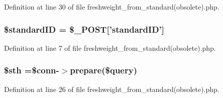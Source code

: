 Definition at line 30 of file freshweight\-\_\-from\-\_\-standard(obsolete).\-php.

\hypertarget{freshweight__from__standard_07obsolete_08_8php_a0c541a369e4a0434108a7d145751bb23}{
\subsubsection[{\$standard\-I\-D}]{\setlength{\rightskip}{0pt plus 5cm}\$standard\-I\-D = \$\-\_\-\-P\-O\-S\-T\mbox{[}'standard\-I\-D'\mbox{]}}}\label{freshweight__from__standard_07obsolete_08_8php_a0c541a369e4a0434108a7d145751bb23}


Definition at line 7 of file freshweight\-\_\-from\-\_\-standard(obsolete).\-php.

\hypertarget{freshweight__from__standard_07obsolete_08_8php_afa9126f9664959c02795be300a135f93}{
\subsubsection[{\$sth}]{\setlength{\rightskip}{0pt plus 5cm}\$sth =\$conn-\/$>$prepare(\$query)}}\label{freshweight__from__standard_07obsolete_08_8php_afa9126f9664959c02795be300a135f93}


Definition at line 26 of file freshweight\-\_\-from\-\_\-standard(obsolete).\-php.


